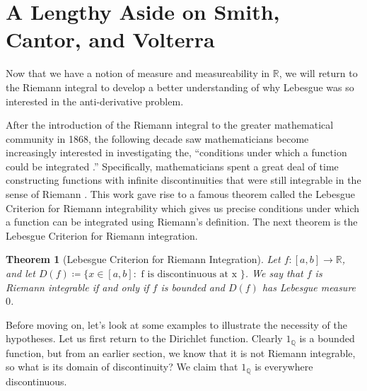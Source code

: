 \documentclass{article}
\newtheorem{theorem}{Theorem}
\theoremstyle{axiom} \newtheorem{axiom}{Axiom}
\theoremstyle{definition} \newtheorem{definition}{Definition}
\theoremstyle{example} \newtheorem{example}{Example}
\theoremstyle{proposition} \newtheorem{prop}{Proposition}
\theoremstyle{lemma} \newtheorem{lemma}{Lemma}
\newcommand{\Q}{\mathbb{Q}}  \newcommand{\R}{\mathbb{R}}
\begin{document}
\section{A Lengthy Aside on Smith, Cantor, and Volterra}

Now that we have a notion of measure and measureability in $\R$, we will return 
to the Riemann integral to develop a better understanding of why Lebesgue was so 
interested in the anti-derivative problem.

After the introduction of the Riemann integral to the greater mathematical
community in 1868, the following decade saw mathematicians become increasingly 
interested in investigating the, ``conditions under which a function could be 
integrated \cite{fleron:1994}.'' Specifically, mathematicians spent a great
deal of time constructing functions with infinite discontinuities that were
still integrable in the sense of Riemann \cite{kline:1972}. This work gave
rise to a famous theorem called the Lebesgue Criterion for Riemann integrability
which gives us precise conditions under which a function can be integrated using 
Riemann's definition. The next theorem is the Lebesgue Criterion for Riemann
integration.
\begin{theorem}[Lebesgue Criterion for Riemann Integration]
	Let $f:[a,b] \rightarrow \R$, and let $D(f) \coloneqq \{x \in [a,b] : 
	\text{ f is discontinuous at x }\}$. We say that $f$ is Riemann integrable
	if and only if $f$ is bounded and $D(f)$ has Lebesgue measure $0$.
\end{theorem}
Before moving on, let's look at some examples to illustrate the necessity of the
hypotheses. Let us first return to the Dirichlet function. Clearly $1_{\Q}$ is
a bounded function, but from an earlier section, we know that it is not Riemann 
integrable, so what is its domain of discontinuity? We claim that 
$1_{\Q}$ is everywhere discontinuous.
\end{document}
